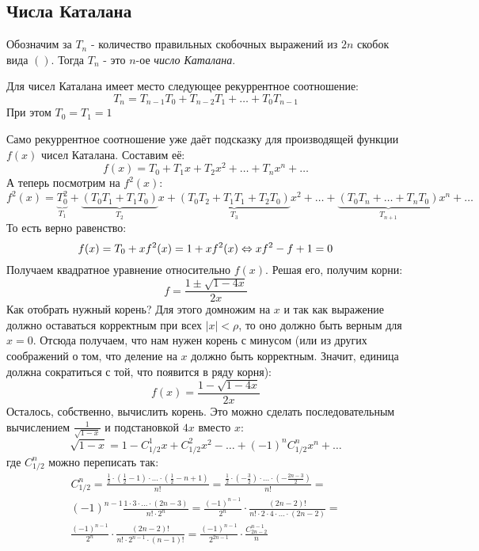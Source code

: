 \subsection{Числа Каталана}

Обозначим за $T_n$ - количество правильных скобочных выражений из $2n$ скобок вида $()$. Тогда $T_n$ - это $n$-ое \textit{число Каталана}.

\begin{proposition}
	Для чисел Каталана имеет место следующее рекуррентное соотношение:
	\[
		T_n = T_{n - 1}T_0 + T_{n - 2}T_1 + \ldots + T_0T_{n - 1}
	\]
	При этом $T_0 = T_1 = 1$
\end{proposition}

Само рекуррентное соотношение уже даёт подсказку для производящей функции $f(x)$ чисел Каталана. Составим её:
\[
	f(x) = T_0 + T_1 x + T_2 x^2 + \ldots + T_n x^n + \ldots
\]
А теперь посмотрим на $f^2(x)$:
\[
	f^2(x) = \underbrace{T_0^2}_{T_1} + \underbrace{(T_0T_1 + T_1T_0)}_{T_2}x + \underbrace{(T_0T_2 + T_1T_1 + T_2T_0)}_{T_3}x^2 + \ldots + \underbrace{(T_0T_n + \ldots + T_nT_0)}_{T_{n + 1}}x^n + \ldots
\]
То есть верно равенство:
\[
	f(x) = T_0 + xf^2(x) = 1 + xf^2(x) \Leftrightarrow xf^2 - f + 1 = 0
\]
Получаем квадратное уравнение относительно $f(x)$. Решая его, получим корни:
\[
	f = \frac{1 \pm \sqrt{1 - 4x}}{2x}
\]
Как отобрать нужный корень? Для этого домножим на $x$ и так как выражение должно оставаться корректным при всех $|x| < \rho$, то оно должно быть верным для $x = 0$. Отсюда получаем, что нам нужен корень с минусом (или из других соображений о том, что деление на $x$ должно быть корректным. Значит, единица должна сократиться с той, что появится в ряду корня):
\[
	f(x) = \frac{1 - \sqrt{1 - 4x}}{2x}
\]
Осталось, собственно, вычислить корень. Это можно сделать последовательным вычислением $\frac{1}{\sqrt{1 - x}}$ и подстановкой $4x$ вместо $x$:
\[
	\sqrt{1 - x} = 1 - C_{1/2}^1 x + C_{1/2}^2 x^2 - \ldots + (-1)^n C_{1/2}^n x^n + \ldots
\]
где $C_{1/2}^n$ можно переписать так:
\begin{multline*}
	C_{1/2}^n = \frac{\frac{1}{2} \cdot \left(\frac{1}{2} - 1\right) \cdot \ldots \cdot \left(\frac{1}{2} - n + 1\right)}{n!} = \frac{\frac{1}{2} \cdot \left(-\frac{3}{2}\right) \cdot \ldots \cdot \left(-\frac{2n - 3}{2}\right)}{n!} =
	\\
	(-1)^{n - 1} \frac{1 \cdot 3 \cdot \ldots \cdot (2n - 3)}{n! \cdot 2^n} = \frac{(-1)^{n - 1}}{2^n} \cdot \frac{(2n - 2)!}{n! \cdot 2 \cdot 4 \cdot \ldots \cdot (2n - 2)} =
	\\
	\frac{(-1)^{n - 1}}{2^n} \cdot \frac{(2n - 2)!}{n! \cdot 2^{n - 1} \cdot (n - 1)!} = \frac{(-1)^{n - 1}}{2^{2n - 1}} \cdot \frac{C_{2n - 2}^{n - 1}}{n}
\end{multline*}
